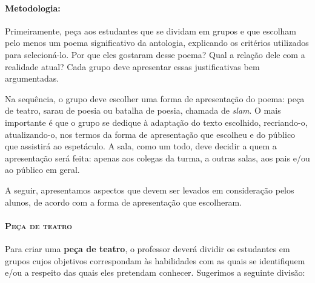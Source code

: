 \documentclass[11pt]{extarticle}
\begin{document}
\paragraph{Metodologia: }

Primeiramente, peça aos estudantes que se dividam em grupos e que
escolham pelo menos um poema significativo da antologia, explicando os
critérios utilizados para selecioná-lo. Por que eles gostaram desse
poema? Qual a relação dele com a realidade atual? Cada grupo deve
apresentar essas justificativas bem argumentadas.

Na sequência, o grupo deve escolher uma forma de apresentação do poema:
peça de teatro, sarau de poesia ou batalha de poesia, chamada de
\emph{slam}. O mais importante é que o grupo se dedique à adaptação do
texto escolhido, recriando-o, atualizando-o, nos termos da forma de
apresentação que escolheu e do público que assistirá ao espetáculo. A
sala, como um todo, deve decidir a quem a apresentação será feita:
apenas aos colegas da turma, a outras salas, aos pais e/ou ao público em
geral.

A seguir, apresentamos aspectos que devem ser levados em consideração
pelos alunos, de acordo com a forma de apresentação que escolheram.

\paragraph{\textsc{Peça de teatro}}

Para criar uma \textbf{peça de teatro}, o professor deverá dividir os
estudantes em grupos cujos objetivos correspondam às habilidades com as
quais se identifiquem e/ou a respeito das quais eles pretendam conhecer.
Sugerimos a seguinte divisão:
\end{document}
